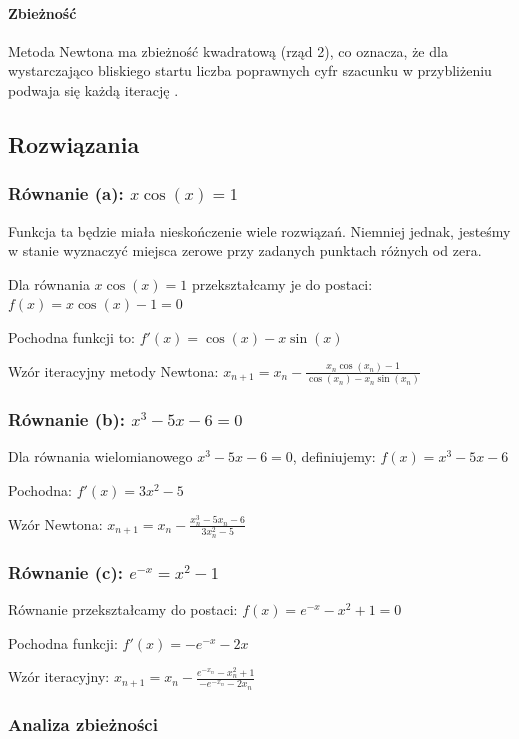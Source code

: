 \documentclass[a4paper,12pt]{article}
\begin{document}
\paragraph{Zbieżność}
Metoda Newtona ma zbieżność kwadratową (rząd 2), co oznacza, że dla wystarczająco bliskiego startu liczba poprawnych cyfr szacunku w przybliżeniu podwaja się każdą iterację \cite{weisstein_newton}.

\subsection{Rozwiązania}

\subsubsection{Równanie (a): $x \cos(x) = 1$}

Funkcja ta będzie miała nieskończenie wiele rozwiązań. Niemniej jednak, jesteśmy w stanie wyznaczyć miejsca zerowe przy zadanych punktach różnych od zera.

Dla równania $x \cos(x) = 1$ przekształcamy je do postaci:
$f(x) = x \cos(x) - 1 = 0$

Pochodna funkcji to:
$f'(x) = \cos(x) - x \sin(x)$

Wzór iteracyjny metody Newtona:
$x_{n+1} = x_n - \frac{x_n \cos(x_n) - 1}{\cos(x_n) - x_n \sin(x_n)}$

\subsubsection{Równanie (b): $x^3 - 5x - 6 = 0$}

Dla równania wielomianowego $x^3 - 5x - 6 = 0$, definiujemy:
$f(x) = x^3 - 5x - 6$

Pochodna:
$f'(x) = 3x^2 - 5$

Wzór Newtona:
$x_{n+1} = x_n - \frac{x_n^3 - 5x_n - 6}{3x_n^2 - 5}$

\subsubsection{Równanie (c): $e^{-x} = x^2 - 1$}

Równanie przekształcamy do postaci:
$f(x) = e^{-x} - x^2 + 1 = 0$

Pochodna funkcji:
$f'(x) = -e^{-x} - 2x$

Wzór iteracyjny:
$x_{n+1} = x_n - \frac{e^{-x_n} - x_n^2 + 1}{-e^{-x_n} - 2x_n}$

\subsubsection{Analiza zbieżności}
\end{document}
